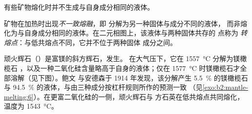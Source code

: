 有些矿物熔化时并不生成与自身成分相同的液体。

\begin{definition}\label{def:b2:mantle-melting:peritectic}
矿物在加热时出现\emph{不一致熔融}，即
分解为另一种固体与成分不同的液体，
而非熔化为与自身成分相同的液体。在二元相图上，该液体与两种固体共存的
点称为
\emph{转熔点}：与低共熔点不同，它并不位于两种固体
成分之间。
\end{definition}

顽火辉石（）是富镁的斜方辉石，发生。
在大气压下，它在 \qty{1557}{\celsius} 分解为镁橄榄石
，以及一种二氧化硅含量略高于自身的液体；仅在
\qty{1577}{\celsius} 时镁橄榄石才全部溶解（见下图）。鲍文
与安德森于 1914 年发现，该分解产生 \qty{5.5}{\percent} 的镁橄榄石与
\qty{94.5}{\percent} 的液体，与由三种成分按杠杆规则所作的预测一致
（见\cref{exo:b2:mantle-melting:6}）。在更富二氧化硅的一侧，顽火辉石与
方石英在低共熔点共同熔化，温度为 \qty{1543}{\celsius}。

